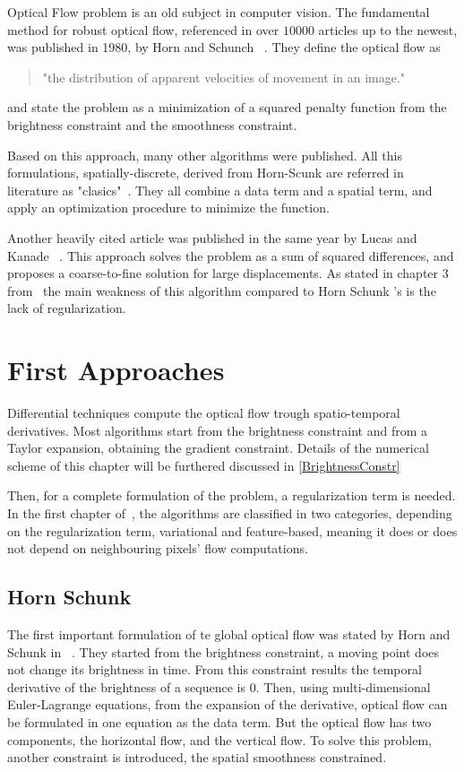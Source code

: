 \documentclass[12pt,a4paper,twoside]{report}
\begin{document}
Optical Flow problem is an old subject in computer vision. The fundamental method for robust optical flow, referenced in over $10000$ articles up to the newest, was published in 1980, by Horn and Schunch ~\cite{HSOpticalFlow}. They define the optical flow as
\begin{quote}
"the distribution of apparent velocities of movement in an image."
\end{quote}
and state the problem as a minimization of a squared penalty function from the brightness constraint and the smoothness constraint.

Based on this approach, many other algorithms were published. All this formulations, spatially-discrete, derived from Horn-Scunk are referred in literature as "clasics"~\cite{sun2010,QAnalysis}. They all combine a data term and a spatial term, and apply an optimization procedure to minimize the function. 

Another heavily cited article was published in the same year by Lucas and Kanade ~\cite{lucas1981}. This approach solves the problem as a sum of squared differences, and proposes a coarse-to-fine solution for large displacements. As stated in chapter 3 from~\cite{mitiche2014computer} the main weakness of this algorithm compared to Horn Schunk 's is the lack of regularization.
 


\section{First Approaches}

Differential techniques compute the optical flow trough spatio-temporal derivatives.
Most algorithms start from the brightness constraint and from a Taylor expansion, obtaining the gradient constraint. Details of the numerical scheme of this chapter will be furthered discussed in \ref{BrightnessConstr}

Then, for a complete formulation of the problem, a regularization term is needed. In the first chapter of~\cite{wedel2011stereo}, the algorithms are classified in two categories, depending on the regularization term, variational and feature-based, meaning it does or does not depend on neighbouring pixels' flow computations.
\subsection{Horn Schunk}
The first important formulation of te global optical flow was stated by Horn and Schunk in ~\cite{HSOpticalFlow}. They started from the brightness constraint, a moving point does not change its brightness in time. From this constraint results the temporal derivative of the brightness of a sequence is $0$. Then,  using multi-dimensional Euler-Lagrange equations, from the expansion of the derivative, optical flow  can be formulated in one equation as the data term. But the optical flow has two components, the horizontal flow, and the vertical flow. To solve this problem, another constraint is introduced, the spatial smoothness constrained. 
\end{document}
